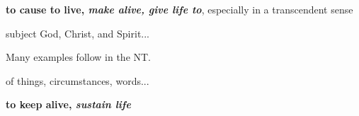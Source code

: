 				\begin{compactdesc}
				
					\item[BDAG 381b] \textbf{}
						\begin{compactitem}
							\item[1] \textbf{to cause to live, \textit{make alive, give life to}}, especially in a transcendent sense 
							\item[1.a] subject God, Christ, and Spirit...
								\begin{compactitem}
									\item Many examples follow in the NT.
								\end{compactitem}
							\item[1.b] of things, circumstances, words...
							\item[2] \textbf{to keep alive, \textit{sustain life}}
						\end{compactitem}
						
						
						
						
						
						
						
						
				\end{compactdesc}
		
